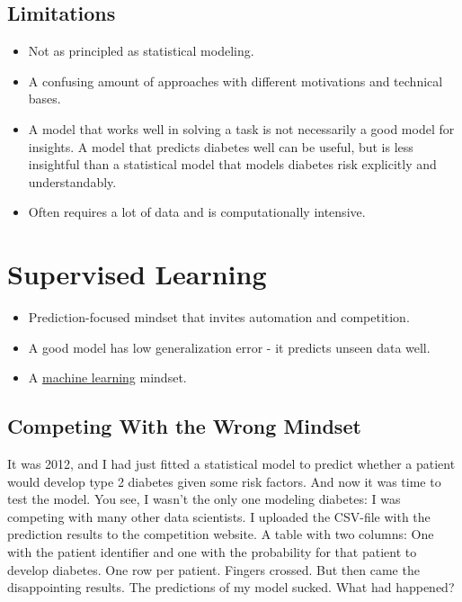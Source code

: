 \documentclass[
  10pt,
]{scrbook}
\providecommand{\tightlist}{%
  \setlength{\itemsep}{0pt}\setlength{\parskip}{0pt}}
\begin{document}
\hypertarget{limitations-5}{%
\section{Limitations}\label{limitations-5}}

\begin{itemize}
\tightlist
\item
  Not as principled as statistical modeling.
\item
  A confusing amount of approaches with different motivations and technical bases.
\item
  A model that works well in solving a task is not necessarily a good model for insights. A model that predicts diabetes well can be useful, but is less insightful than a statistical model that models diabetes risk explicitly and understandably.
\item
  Often requires a lot of data and is computationally intensive.
\end{itemize}

\hypertarget{supervised-ml}{%
\chapter{Supervised Learning}\label{supervised-ml}}

\begin{itemize}
\tightlist
\item
  Prediction-focused mindset that invites automation and competition.
\item
  A good model has low generalization error - it predicts unseen data well.
\item
  A \protect\hyperlink{machine-learning}{machine learning} mindset.
\end{itemize}

\hypertarget{competing-with-the-wrong-mindset}{%
\section{Competing With the Wrong Mindset}\label{competing-with-the-wrong-mindset}}

It was 2012, and I had just fitted a statistical model to predict whether a patient would develop type 2 diabetes given some risk factors.
And now it was time to test the model.
You see, I wasn't the only one modeling diabetes:
I was competing with many other data scientists.
I uploaded the CSV-file with the prediction results to the competition website.
A table with two columns: One with the patient identifier and one with the probability for that patient to develop diabetes.
One row per patient.
Fingers crossed.
But then came the disappointing results.
The predictions of my model sucked.
What had happened?
\end{document}
